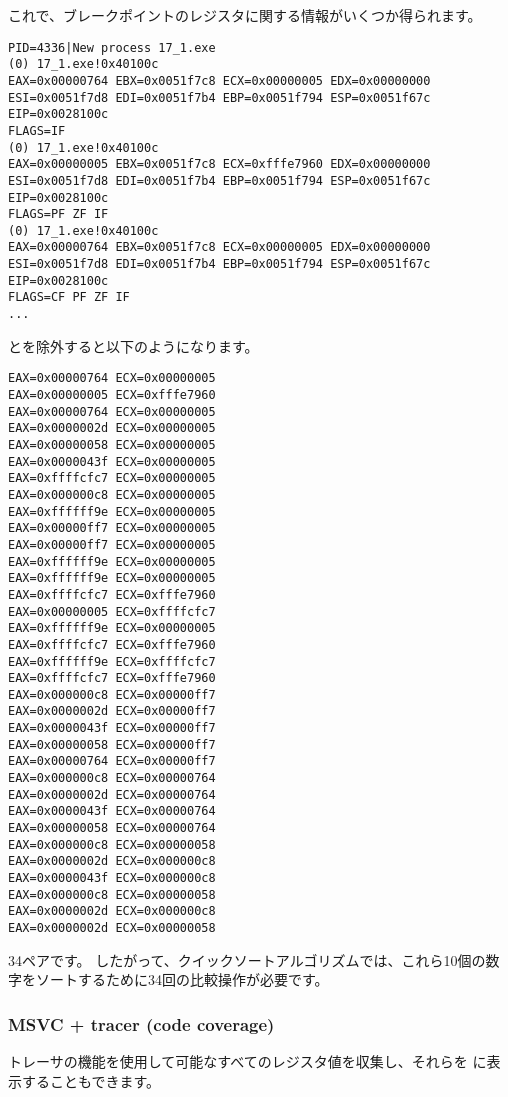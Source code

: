 これで、ブレークポイントのレジスタに関する情報がいくつか得られます。

\begin{lstlisting}
PID=4336|New process 17_1.exe
(0) 17_1.exe!0x40100c
EAX=0x00000764 EBX=0x0051f7c8 ECX=0x00000005 EDX=0x00000000
ESI=0x0051f7d8 EDI=0x0051f7b4 EBP=0x0051f794 ESP=0x0051f67c
EIP=0x0028100c
FLAGS=IF
(0) 17_1.exe!0x40100c
EAX=0x00000005 EBX=0x0051f7c8 ECX=0xfffe7960 EDX=0x00000000
ESI=0x0051f7d8 EDI=0x0051f7b4 EBP=0x0051f794 ESP=0x0051f67c
EIP=0x0028100c
FLAGS=PF ZF IF
(0) 17_1.exe!0x40100c
EAX=0x00000764 EBX=0x0051f7c8 ECX=0x00000005 EDX=0x00000000
ESI=0x0051f7d8 EDI=0x0051f7b4 EBP=0x0051f794 ESP=0x0051f67c
EIP=0x0028100c
FLAGS=CF PF ZF IF
...
\end{lstlisting}

とを除外すると以下のようになります。

\begin{lstlisting}
EAX=0x00000764 ECX=0x00000005
EAX=0x00000005 ECX=0xfffe7960
EAX=0x00000764 ECX=0x00000005
EAX=0x0000002d ECX=0x00000005
EAX=0x00000058 ECX=0x00000005
EAX=0x0000043f ECX=0x00000005
EAX=0xffffcfc7 ECX=0x00000005
EAX=0x000000c8 ECX=0x00000005
EAX=0xffffff9e ECX=0x00000005
EAX=0x00000ff7 ECX=0x00000005
EAX=0x00000ff7 ECX=0x00000005
EAX=0xffffff9e ECX=0x00000005
EAX=0xffffff9e ECX=0x00000005
EAX=0xffffcfc7 ECX=0xfffe7960
EAX=0x00000005 ECX=0xffffcfc7
EAX=0xffffff9e ECX=0x00000005
EAX=0xffffcfc7 ECX=0xfffe7960
EAX=0xffffff9e ECX=0xffffcfc7
EAX=0xffffcfc7 ECX=0xfffe7960
EAX=0x000000c8 ECX=0x00000ff7
EAX=0x0000002d ECX=0x00000ff7
EAX=0x0000043f ECX=0x00000ff7
EAX=0x00000058 ECX=0x00000ff7
EAX=0x00000764 ECX=0x00000ff7
EAX=0x000000c8 ECX=0x00000764
EAX=0x0000002d ECX=0x00000764
EAX=0x0000043f ECX=0x00000764
EAX=0x00000058 ECX=0x00000764
EAX=0x000000c8 ECX=0x00000058
EAX=0x0000002d ECX=0x000000c8
EAX=0x0000043f ECX=0x000000c8
EAX=0x000000c8 ECX=0x00000058
EAX=0x0000002d ECX=0x000000c8
EAX=0x0000002d ECX=0x00000058
\end{lstlisting}

34ペアです。
したがって、クイックソートアルゴリズムでは、これら10個の数字をソートするために34回の比較操作が必要です。

\clearpage
\subsubsection{MSVC + tracer (code coverage)}

トレーサの機能を使用して可能なすべてのレジスタ値を収集し、それらを \IDA に表示することもできます。


